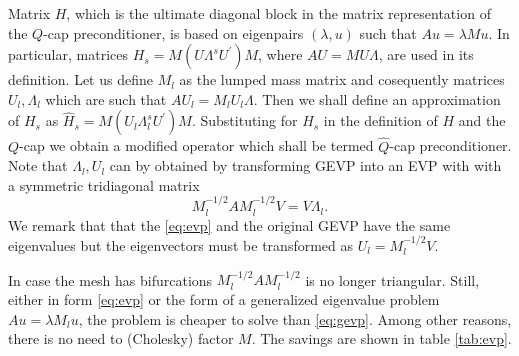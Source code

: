 \documentclass[10pt, a4paper]{article}
\newcommand{\dual}[1]{\ensuremath{{#1}^{\prime}}}
\begin{document}
Matrix $H$, which is the ultimate diagonal block in the matrix representation of
the $Q$-cap preconditioner, is based on eigenpairs $(\lambda, u)$ such that 
$Au=\lambda M u$. In particular, matrices $H_s=M(U\Lambda^s \dual{U})M$, where
$AU=MU\Lambda$, are used in its definition. Let us define $M_l$ as the lumped
mass matrix and cosequently matrices $U_l, \Lambda_l$ which are such that
$AU_l=M_l U_l\Lambda$. Then we shall define an approximation of $H_s$ as
$\hat{H}_s=M(U_l\Lambda^s_l\dual{U})M$. Substituting for $H_s$ in the definition
of $H$ and the $Q$-cap we obtain a modified operator which shall be termed 
$\hat{Q}$-cap preconditioner.
Note that $\Lambda_l, U_l$ can by obtained by transforming GEVP into an EVP with 
with a symmetric tridiagonal matrix
\begin{equation}\label{eq:evp}
  M_l^{-1/2}A M_l^{-1/2} V=V\Lambda_l.
\end{equation}
We remark that that the \eqref{eq:evp} and the original GEVP have the same
eigenvalues but the eigenvectors must be transformed as $U_l=M_l^{-1/2} V$.

In case the mesh has bifurcations $M_l^{-1/2}A M_l^{-1/2}$ is no longer 
triangular. Still, either in form \eqref{eq:evp} or the form of a
generalized eigenvalue problem $Au=\lambda M_l u$, the problem is cheaper to
solve than \eqref{eq:gevp}. Among other reasons, there is no need to (Cholesky) 
factor $M$. The savings are shown in table \ref{tab:evp}.
\end{document}
